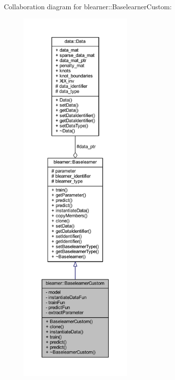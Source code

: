 Collaboration diagram for blearner\+:\+:Baselearner\+Custom\+:\nopagebreak
\begin{figure}[H]
\begin{center}
\leavevmode
\includegraphics[height=550pt]{classblearner_1_1_baselearner_custom__coll__graph}
\end{center}
\end{figure}
